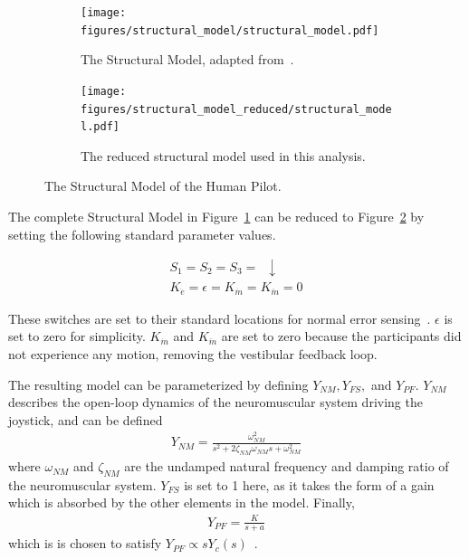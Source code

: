 \begin{figure}[t]
    \centering
    \begin{subfigure}[b]{\textwidth}
        \centering
        \texttt{[image: figures/structural\_model/structural\_model.pdf]}
        \caption[The Structural Model]{The Structural Model, adapted from~\citet{hess_unified_1997}.}
        \label{fig:structuralmodel}
    \end{subfigure}
    \hfill
    \begin{subfigure}[b]{\textwidth}
        \centering
        \texttt{[image: figures/structural\_model\_reduced/structural\_model.pdf]}
        \caption[The reduced structural model used in this analysis]{The reduced structural model used in this analysis.}
        \label{fig:structuralmodelreduced}
    \end{subfigure}
    \caption[The Structural Model of the Human Pilot]{The Structural Model of the Human Pilot.}
    \label{fig:structuralmodels}
\end{figure}

The complete Structural Model in Figure~\ref{fig:structuralmodel} can be reduced to Figure~\ref{fig:structuralmodelreduced} by setting the following standard parameter values.

\begin{align}
    \nonumber    S_1 = S_2 = S_3 = \enspace \downarrow \\
    \nonumber    K_{\dot{e}} = \epsilon = K_{\dot{m}} = K_{\ddot{m}} = 0
\end{align}

These switches are set to their standard locations for normal error sensing~\citep{hess_unified_1997}.
$\epsilon$ is set to zero for simplicity.
$K_{\dot{m}}$ and $K_{\ddot{m}}$ are set to zero because the participants did not experience any motion, removing the vestibular feedback loop.

The resulting model can be parameterized by defining $Y_{NM}, Y_{FS},$ and $Y_{PF}$.
$Y_{NM}$ describes the open-loop dynamics of the neuromuscular system driving the joystick, and can be defined
\begin{align}
    Y_{NM} = \frac{\omega^2_{NM}}{s^2 + 2 \zeta_{NM} \omega_{NM} s + \omega^2_{NM}}
\end{align}
where $\omega_{NM}$ and $\zeta_{NM}$ are the undamped natural frequency and damping ratio of the neuromuscular system.
$Y_{FS}$ is set to 1 here, as it takes the form of a gain which is absorbed by the other elements in the model.
Finally,
\begin{align} \label{eq:ypf}
    Y_{PF} = \frac{K}{s+a}
\end{align}
which is is chosen to satisfy $Y_{PF} \propto s Y_c (s)$~\citep{hess_unified_1997}.

